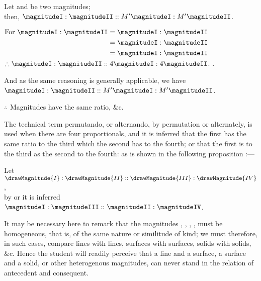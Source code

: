 \begin{center}
Let  and  be two magnitudes;\\
then, $\magnitudeI : \magnitudeII :: M' \magnitudeI : M' \magnitudeII$.

$\begin{aligned}
\mbox{For } \magnitudeI : \magnitudeII &= \magnitudeI : \magnitudeII \\
&= \magnitudeI : \magnitudeII \\
&= \magnitudeI : \magnitudeII \\
\end{aligned}$\\
$\therefore \magnitudeI : \magnitudeII :: 4 \magnitudeI : 4 \magnitudeII$. .

And as the same reasoning is generally applicable, we have\\
$\magnitudeI : \magnitudeII :: M' \magnitudeI : M' \magnitudeII$.

$\therefore$ Magnitudes have the same ratio, \&c.
\end{center}


\vfill\pagebreak

\label{def:V.XIII} 
The technical term permutando, or alternando, by permutation or alternately, is used when there are four proportionals, and it is inferred that the first has the same ratio to the third which the second has to the fourth; or that the first is to the third as the second to the fourth: as is shown in the following proposition :—

\begin{center}
Let $\drawMagnitude{I} : \drawMagnitude{II} :: \drawMagnitude{III} : \drawMagnitude{IV}$,\\
by  or  it is inferred\\
$\magnitudeI : \magnitudeIII :: \magnitudeII : \magnitudeIV$.
\end{center}

It may be necessary here to remark that the magnitudes \magnitudeI, \magnitudeII, \magnitudeIII, \magnitudeIV, must be homogeneous, that is, of the same nature or similitude of kind; we must therefore, in such cases, compare lines with lines, surfaces with surfaces, solids with solids, \&c. Hence the student will readily perceive that a line and a surface, a surface and a solid, or other heterogenous magnitudes, can never stand in the relation of antecedent and consequent.

